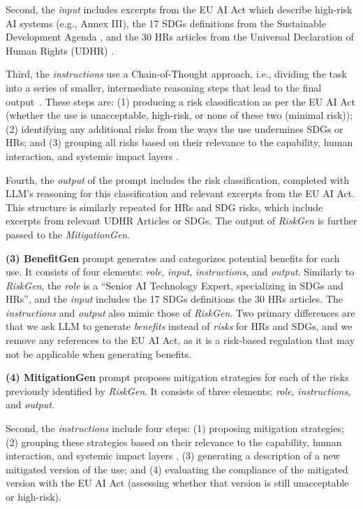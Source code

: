 Second, the \emph{input} includes excerpts from the EU AI Act which describe high-risk AI systems (e.g., Annex III), the 17 SDGs definitions from the Sustainable Development Agenda \cite{sdgs}, and the 30 HRs articles from the Universal Declaration of Human Rights (UDHR) \cite{rights1961universal}.

Third, the \emph{instructions} use a Chain-of-Thought approach, i.e., dividing the task into a series of smaller, intermediate reasoning steps that lead to the final output~\cite{NEURIPS2022_9d560961}. These steps are: (1) producing a risk classification as per the EU AI Act (whether the use is unacceptable, high-risk, or none of these two (minimal risk)); (2) identifying any additional risks from the ways the use undermines SDGs or HRs; and (3) grouping all risks based on their relevance to the capability, human interaction, and systemic impact layers \cite{weidinger2023sociotechnical}. 

Fourth, the \emph{output} of the prompt includes the risk classification, completed with LLM's reasoning for this classification and relevant excerpts from the EU AI Act. This structure is similarly repeated for HRs and SDG risks, which include excerpts from relevant UDHR Articles or SDGs. The output of \emph{RiskGen} is further passed to the \emph{MitigationGen}.

\smallskip
\noindent\textbf{(3) BenefitGen} prompt generates and categorizes potential benefits for each use. It consists of four elements: \emph{role}, \emph{input}, \emph{instructions}, and \emph{output}. Similarly to \emph{RiskGen}, the \emph{role} is a ``Senior AI Technology Expert, specializing in SDGs and HRs'', and the \emph{input} includes the 17 SDGs definitions the 30 HRs articles. The \emph{instructions} and \emph{output} also mimic those of \emph{RiskGen}. 
Two primary differences are that we ask LLM to generate \emph{benefits} instead of \emph{risks} for HRs and SDGs, and we remove any references to the EU AI Act, as it is a risk-based regulation that may not be applicable when generating benefits.

\smallskip
\noindent\textbf{(4) MitigationGen} prompt proposes mitigation strategies for each of the risks previously identified by \emph{RiskGen}. It consists of three elements: \emph{role}, \emph{instructions}, and \emph{output}. 

Second, the \emph{instructions} include four steps: (1) proposing mitigation strategies; (2) grouping these strategies based on their relevance to the capability, human interaction, and systemic impact layers \cite{weidinger2023sociotechnical}, (3) generating a description of a new mitigated version of the use; and (4) evaluating the compliance of the mitigated version with the EU AI Act (assessing whether that version is still unacceptable or high-risk).


